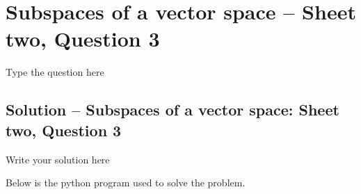 \section{Subspaces of a vector space -- Sheet two, Question 3}
Type  the question here


\subsection{Solution -- Subspaces of a vector space: Sheet two, Question 3}

Write your solution here

Below is the python program used to solve the problem. 
